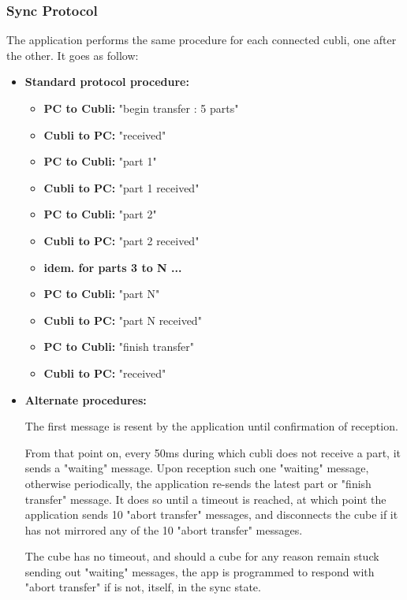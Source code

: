 \subsubsection{Sync Protocol}

The application performs the same procedure for each connected cubli, one after the other. It goes as follow:

\begin{itemize}
\item[] \textbf{Standard protocol procedure:}

\begin{itemize}
\item[] \textbf{PC to Cubli:} "begin transfer : 5 parts"
\item[] \textbf{Cubli to PC:} "received"
\item[] \textbf{PC to Cubli:} "part 1"
\item[] \textbf{Cubli to PC:} "part 1 received"
\item[] \textbf{PC to Cubli:} "part 2"
\item[] \textbf{Cubli to PC:} "part 2 received"
\item[] \textbf{idem. for parts 3 to N ...}
\item[] \textbf{PC to Cubli:} "part N"
\item[] \textbf{Cubli to PC:} "part N received"
\item[] \textbf{PC to Cubli:} "finish transfer"
\item[] \textbf{Cubli to PC:} "received"
\end{itemize}

\item[] \textbf{Alternate procedures:}

The first message is resent by the application until confirmation of reception.

From that point on, every 50ms during which cubli does not receive a part, it sends a "waiting" message. 
Upon reception such one "waiting" message, otherwise periodically, the application re-sends the latest part or "finish transfer" message. It does so until a timeout is reached, at which point the application sends 10 "abort transfer" messages, and disconnects the cube if it has not mirrored any of the 10 "abort transfer" messages.

The cube has no timeout, and should a cube for any reason remain stuck sending out "waiting" messages, the app is programmed to respond with "abort transfer" if is not, itself, in the sync state.

\end{itemize}


